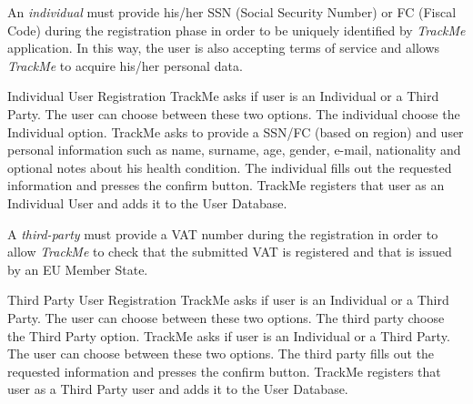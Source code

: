 \documentclass[a4paper]{article}
\begin{document}
        An \textit{individual} must provide his/her SSN (Social Security Number) or FC (Fiscal Code) during the registration phase in order to be uniquely identified by \textit{TrackMe} application. In this way, the user is also accepting terms of service and allows \textit{TrackMe} to acquire his/her personal data.
        \begin{usecase}{Individual User Registration}
              {TrackMe asks if user is an Individual or a Third Party. The user can choose between these two options.}
              {The individual choose the Individual option.}
              {TrackMe asks to provide a SSN/FC (based on region) and user personal information such as name, surname, age, gender, e-mail, nationality and optional notes about his health condition.}
              {The individual fills out the requested information and presses the confirm button.}
              {TrackMe registers that user as an Individual User and adds it to the User Database.}
        \end{usecase}
        
        A \textit{third-party} must provide a VAT number during the registration in order to allow \textit{TrackMe} to check that the submitted VAT is registered and that is issued by an EU Member State.
        
        \begin{usecase}{Third Party User Registration}
              {TrackMe asks if user is an Individual or a Third Party. The user can choose between these two options.}
              {The third party choose the Third Party option.}
              {TrackMe asks if user is an Individual or a Third Party. The user can choose between these two options.}
              {The third party fills out the requested information and presses the confirm button.}
              {TrackMe registers that user as a Third Party user and adds it to the User Database.}
        \end{usecase}
        
\end{document}
